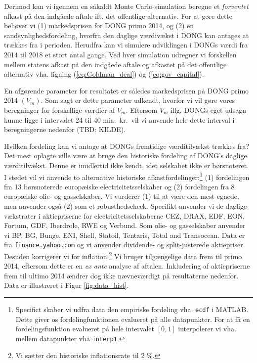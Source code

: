 \documentclass{article}
\begin{document}
Derimod kan vi igennem en såkaldt Monte Carlo-simulation beregne et \emph{forventet} afkast på den indgåede aftale ift. det offentlige alternativ. For at gøre dette behøver vi (1) markedsprisen for DONG primo 2014, og (2) en sandsynlighedsfordeling, hvorfra den daglige værdivækst i DONG kan antages at trækkes fra i perioden. Herudfra kan vi simulere udviklingen i DONGs værdi fra 2014 til 2018 et stort antal gange. Ved hver simulation udregner vi forskellen mellem statens afkast på den indgåede aftale og afkastet på det offentlige alternativ vha. ligning (\ref{eq:Goldman_deal}) og (\ref{eq:gov_capital}).

En afgørende parameter for resultatet er således markedsprisen på DONG primo 2014 $(V_m)$. Som sagt er dette parameter udkendt, hvorfor vi vil gøre vores beregninger for forskellige værdier af $V_m$. Eftersom $V_m$ iflg. DONGs eget udsagn kunne ligge i intervalet 24 til 40 mia.\ kr.\ vil vi anvende hele dette interval i beregningerne nedenfor (TBD: KILDE).

Hvilken fordeling kan vi antage at DONGs fremtidige værditilvækst trækkes fra? Det mest oplagte ville være at bruge den historiske fordeling af DONG's daglige værditilvækst. Denne er imidlertid ikke kendt, idet selskabet ikke er børsnoteret. I stedet vil vi anvende to alternative historiske afkastfordelinger:\footnote{Specifict skaber vi udfra data den empiriske fordeling vha. \texttt{ecdf} i MATLAB. Dette giver os fordelingfunktionen evalueret på alle datapunkter. For at få en fordelingsfunktion evalueret på hele intervalet $[0,1]$ interpolerer vi vha. mellem datapunkter vha \texttt{interp1}.} (1)  fordelingen fra 13 børsnoterede europæiske electricitetsselskaber og (2) fordelingen fra 8 europæiske olie- og gasselskaber. Vi vurderer (1) til at være den mest egnede, men anvender også (2) som et robusthedscheck. Specifikt anvender vi de daglige vækstrater i aktiepriserne for electricitetsselskaberne CEZ, DRAX, EDF, EON, Fortum, GDF, Iberdrole, RWE og Verbund. Som olie- og gasselskaber anvender vi BP, BG, Bunge, ENI, Shell, Statoil, Tentaris, Total and Transocean. Data er fra \texttt{finance.yahoo.com} og vi anvender dividende- og split-justerede aktiepriser. Desuden korrigerer vi for inflation.\footnote{Vi sætter den historiske inflationsrate til 2 \%.} Vi bruger tilgængelige data frem til primo 2014, eftersom dette er en \emph{ex ante} analyse af aftalen. Inkludering af aktiepriserne frem til ultimo 2014 ændrer dog ikke nævneværdigt på resultaterne nedenfor. Data er illustreret i Figur \ref{fig:data_hist}.
\end{document}
